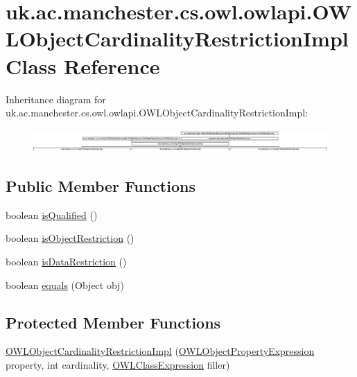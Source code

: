 \hypertarget{classuk_1_1ac_1_1manchester_1_1cs_1_1owl_1_1owlapi_1_1_o_w_l_object_cardinality_restriction_impl}{\section{uk.\-ac.\-manchester.\-cs.\-owl.\-owlapi.\-O\-W\-L\-Object\-Cardinality\-Restriction\-Impl Class Reference}
\label{classuk_1_1ac_1_1manchester_1_1cs_1_1owl_1_1owlapi_1_1_o_w_l_object_cardinality_restriction_impl}
}
Inheritance diagram for uk.\-ac.\-manchester.\-cs.\-owl.\-owlapi.\-O\-W\-L\-Object\-Cardinality\-Restriction\-Impl\-:\begin{figure}[H]
\begin{center}
\leavevmode
\includegraphics[height=0.882585cm]{classuk_1_1ac_1_1manchester_1_1cs_1_1owl_1_1owlapi_1_1_o_w_l_object_cardinality_restriction_impl}
\end{center}
\end{figure}
\subsection*{Public Member Functions}
\begin{DoxyCompactItemize}
\item 
boolean \hyperlink{classuk_1_1ac_1_1manchester_1_1cs_1_1owl_1_1owlapi_1_1_o_w_l_object_cardinality_restriction_impl_ab64efce3121ff56e15b26674b5de2f17}{is\-Qualified} ()
\item 
boolean \hyperlink{classuk_1_1ac_1_1manchester_1_1cs_1_1owl_1_1owlapi_1_1_o_w_l_object_cardinality_restriction_impl_a249478ae01c197110dd79186674112ee}{is\-Object\-Restriction} ()
\item 
boolean \hyperlink{classuk_1_1ac_1_1manchester_1_1cs_1_1owl_1_1owlapi_1_1_o_w_l_object_cardinality_restriction_impl_a14fa4ba0fe3eedeb22ecc6bde16f2e52}{is\-Data\-Restriction} ()
\item 
boolean \hyperlink{classuk_1_1ac_1_1manchester_1_1cs_1_1owl_1_1owlapi_1_1_o_w_l_object_cardinality_restriction_impl_aef4170e2eb26249c26f85c63bc1e2231}{equals} (Object obj)
\end{DoxyCompactItemize}
\subsection*{Protected Member Functions}
\begin{DoxyCompactItemize}
\item 
\hyperlink{classuk_1_1ac_1_1manchester_1_1cs_1_1owl_1_1owlapi_1_1_o_w_l_object_cardinality_restriction_impl_a2005af5f202c3548551e5708236f72bc}{O\-W\-L\-Object\-Cardinality\-Restriction\-Impl} (\hyperlink{interfaceorg_1_1semanticweb_1_1owlapi_1_1model_1_1_o_w_l_object_property_expression}{O\-W\-L\-Object\-Property\-Expression} property, int cardinality, \hyperlink{interfaceorg_1_1semanticweb_1_1owlapi_1_1model_1_1_o_w_l_class_expression}{O\-W\-L\-Class\-Expression} filler)
\end{DoxyCompactItemize}

